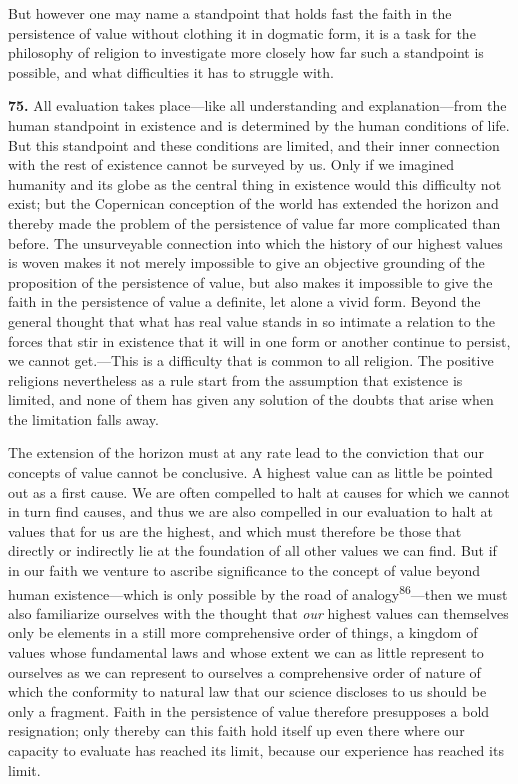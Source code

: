 \documentclass[12pt,a4paper]{book}
\newcommand{\opage}[1]{\marginnote{\footnotesize\textit{[#1]}}}
\begin{document}
But however one may name a standpoint that holds fast the faith in the persistence of value without
clothing it in dogmatic form, it is a task for the philosophy of religion to investigate more closely
how far such a standpoint is possible, and what difficulties it has to struggle with.

\medskip

\noindent\textbf{75.} All evaluation takes place---like all understanding and explanation---from
the human standpoint in existence and is determined by the human conditions of life. But this
standpoint and these conditions are limited, and their inner connection with the rest of existence
cannot be surveyed by us. Only if we imagined humanity and its globe as the central thing in
existence would this difficulty not exist; but the Copernican conception of the world has extended
the horizon and thereby made the problem of the persistence of value far more complicated than
before. The unsurveyable connection into which the history of our highest values is woven makes it
not merely impossible to give an objective grounding of the proposition of the persistence of value,
but also makes it impossible to give the faith in the persistence of value a definite, let alone a
vivid form. Beyond the general thought that what has real value stands in so intimate a 
\opage{174}relation to
the forces that stir in existence that it will in one form or another continue to persist, we cannot
get.---This is a difficulty that is common to all religion. The positive religions nevertheless as a
rule start from the assumption that existence is limited, and none of them has given any solution of
the doubts that arise when the limitation falls away.

The extension of the horizon must at any rate lead to the conviction that our concepts of value
cannot be conclusive. A highest value can as little be pointed out as a first cause. We are often
compelled to halt at causes for which we cannot in turn find causes, and thus we are also compelled
in our evaluation to halt at values that for us are the highest, and which must therefore be those
that directly or indirectly lie at the foundation of all other values we can find. But if in our
faith we venture to ascribe significance to the concept of value beyond human existence---which is
only possible by the road of analogy\textsuperscript{86}---then we must also familiarize ourselves
with the thought that \emph{our} highest values can themselves only be elements in a still more
comprehensive order of things, a kingdom of values whose fundamental laws and whose extent we can as
little represent to ourselves as we can represent to ourselves a comprehensive order of nature of
which the conformity to natural law that our science discloses to us should be only a fragment.
Faith in the persistence of value therefore presupposes a bold resignation; only thereby can this
faith hold itself up even there where our capacity to evaluate has reached its limit, because our
experience has reached its limit.
\end{document}
